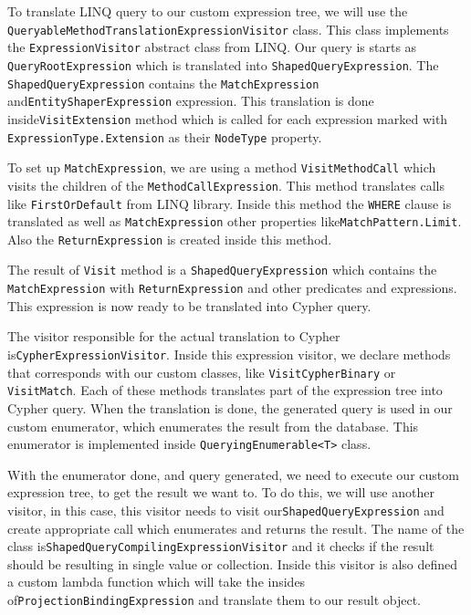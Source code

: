 To translate LINQ query to our custom expression tree, we will use the \texttt{QueryableMethodTranslationExpressionVisitor} class.
This class implements the \texttt{ExpressionVisitor} abstract class from LINQ. Our query is starts as \texttt{QueryRootExpression} which is
translated into \texttt{ShapedQueryExpression}. The \texttt{ShapedQueryExpression} contains the \texttt{MatchExpression} and\linebreak\texttt{EntityShaperExpression}
expression. This translation is done inside\linebreak\texttt{VisitExtension} method which is called for each expression marked with \texttt{ExpressionType.Extension}
as their \texttt{NodeType} property.

To set up \texttt{MatchExpression}, we are using a method \texttt{VisitMethodCall} which visits the children of the \texttt{MethodCallExpression}.
This method translates calls like \texttt{FirstOrDefault} from LINQ library. Inside this method the \texttt{WHERE} clause is translated as well
as \texttt{MatchExpression} other properties like\linebreak\texttt{MatchPattern.Limit}. Also the \texttt{ReturnExpression} is created inside this method.

The result of \texttt{Visit} method is a \texttt{ShapedQueryExpression} which contains the \texttt{MatchExpression}
with \texttt{ReturnExpression} and other predicates and expressions. This expression is now ready to be translated into Cypher query.

The visitor responsible for the actual translation to Cypher is\linebreak\texttt{CypherExpressionVisitor}. Inside this expression visitor,
we declare methods that corresponds with our custom classes, like \texttt{VisitCypherBinary} or \texttt{VisitMatch}. Each of these methods translates part of the expression
tree into Cypher query. When the translation is done, the generated query is used in our custom enumerator, which enumerates the result from the database. This enumerator
is implemented inside \texttt{QueryingEnumerable<T>} class.

With the enumerator done, and query generated, we need to execute our custom expression tree, to get the result we want to. To do this, we will use another visitor, in
this case, this visitor needs to visit our\linebreak\texttt{ShapedQueryExpression} and create appropriate call which enumerates and returns the result.
The name of the class is\linebreak\texttt{ShapedQueryCompilingExpressionVisitor} and it checks if the result should be resulting in single value or collection.
Inside this visitor is also defined a custom lambda function which will take the insides of\linebreak\texttt{ProjectionBindingExpression} and translate them to our result object.

